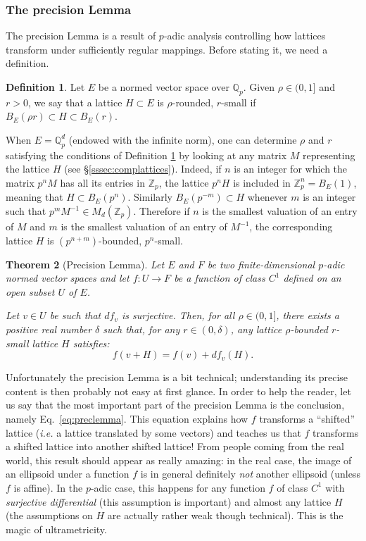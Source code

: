\documentclass[11pt]{article}
\numberwithin{equation}{section}
\numberwithin{figure}{section}
\newtheorem{theo}{Theorem}[section]
\theoremstyle{definition}
\newtheorem{deftn}[theo]{Definition}
\newcommand{\Z}{\mathbb Z}
\newcommand{\Zp}{\Z_p}
\newcommand{\Q}{\mathbb Q}
\newcommand{\Qp}{\Q_p}
\begin{document}
\subsubsection{The precision Lemma}
\label{sssec:preclemma}

The precision Lemma is a result of $p$-adic analysis controlling how 
lattices transform under sufficiently regular mappings. Before stating 
it, we need a definition.

\begin{deftn}
\label{def:roundedsmall}
Let $E$ be a normed vector space over $\Qp$. 
Given $\rho \in (0,1]$ and $r > 0$, we say that a lattice $H \subset E$ 
is $\rho$-rounded, $r$-small if
$B_E(\rho r) \subset H \subset B_E(r)$.
\end{deftn}

When $E = \Qp^d$ (endowed with the infinite norm), one can determine 
$\rho$ and $r$ satisfying the conditions of Definition 
\ref{def:roundedsmall} by looking at any matrix $M$ representing the 
lattice $H$ (see \S \ref{sssec:complattices}). Indeed, if $n$ is an 
integer for which the matrix $p^n M$ has all its entries in $\Zp$, the 
lattice $p^n H$ is included in $\Zp^n = B_E(1)$, meaning that $H \subset 
B_E(p^n)$. Similarly $B_E(p^{-m}) \subset H$ whenever $m$ is an integer 
such that $p^m M^{-1} \in M_d(\Zp)$.
Therefore if $n$ is the smallest valuation of an entry of $M$ and $m$
is the smallest valuation of an entry of $M^{-1}$, the corresponding
lattice $H$ is $(p^{n+m})$-bounded, $p^n$-small.

\begin{theo}[Precision Lemma]
\label{theo:preclemma}
Let $E$ and $F$ be two finite-dimensional $p$-adic normed vector spaces
and let $f : U \rightarrow F$ be a function of class $C^1$ defined on an 
open subset $U$ of $E$.

Let $v \in U$ be such that $df_v$ is surjective.
Then, for all $\rho \in (0, 1]$, there exists a positive real number 
$\delta$ such that, for any $r \in (0,\delta)$, any lattice 
$\rho$-bounded $r$-small lattice $H$ satisfies:
\begin{equation}
\label{eq:preclemma}
f(v+H) = f(v) + df_v(H).
\end{equation}
\end{theo}

Unfortunately the precision Lemma is a bit technical; understanding its 
precise content is then probably not easy at first glance. In order to 
help the reader, let us say that the most important part of the 
precision Lemma is the conclusion, namely Eq.~\eqref{eq:preclemma}. This 
equation explains how $f$ transforms a ``shifted'' lattice (\emph{i.e.} 
a lattice translated by some vectors) and teaches us that $f$ transforms 
a shifted lattice into another shifted lattice! From people coming from 
the real world, this result should appear as really amazing: in the real 
case, the image of an ellipsoid under a function $f$ is in general 
definitely \emph{not} another ellipsoid (unless $f$ is affine). In the 
$p$-adic case, this happens for any function $f$ of class $C^1$ with 
\emph{surjective differential} (this assumption is important) and almost 
any lattice $H$ (the assumptions on $H$ are actually rather weak though 
technical). This is the magic of ultrametricity.
\end{document}
